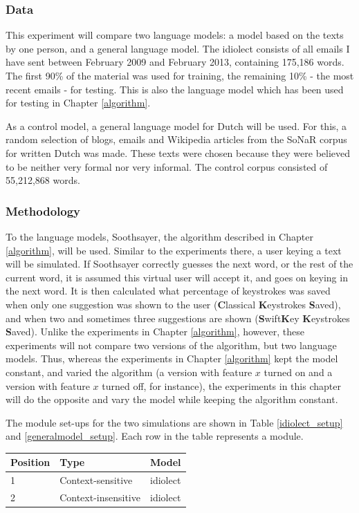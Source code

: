 \documentclass[11pt]{article}
\let\originaltable\table
\let\endoriginaltable\endtable
\renewenvironment{table}[1][ht]{%
  \originaltable[#1]
  \centering}%
  {\endoriginaltable}
\begin{document}
\subsubsection{Data} \label{data_simple}
This experiment will compare two language models: a model based on the texts by one person, and a general language model. The idiolect consists of all emails I have sent between February 2009 and February 2013, containing 175,186 words. The first 90\% of the material was used for training, the remaining 10\% - the most recent emails - for testing. This is also the language model which has been used for testing in Chapter \ref{algorithm}. 

As a control model, a general language model for Dutch will be used. For this, a random selection of blogs, emails and Wikipedia articles from the SoNaR corpus for written Dutch \cite{oostdijk+13} was made. These texts were chosen because they were believed to be neither very formal nor very informal. The control corpus consisted of 55,212,868 words.

\subsubsection{Methodology}
To the language models, Soothsayer, the algorithm described in Chapter \ref{algorithm}, will be used. Similar to the experiments there, a user keying a text will be simulated. If Soothsayer correctly guesses the next word, or the rest of the current word, it is assumed this virtual user will accept it, and goes on keying in the next word. It is then calculated what percentage of keystrokes was saved when only one suggestion was shown to the user (\textbf{C}lassical \textbf{K}eystrokes \textbf{S}aved), and when two and sometimes three suggestions are shown (\textbf{S}wift\textbf{K}ey \textbf{K}eystrokes \textbf{S}aved). Unlike the experiments in Chapter \ref{algorithm}, however, these experiments will not compare two versions of the algorithm, but two language models. Thus, whereas the experiments in Chapter \ref{algorithm} kept the model constant, and varied the algorithm (a version with feature $x$ turned on and a version with feature $x$ turned off, for instance), the experiments in this chapter will do the opposite and vary the model while keeping the algorithm constant. 

The module set-ups for the two simulations are shown in Table \ref{idiolect_setup} and \ref{generalmodel_setup}. Each row in the table represents a module.

\begin{table}[H]
\begin{tabular}{lll} 
Position&Type&Model\\
\hline
1&Context-sensitive&idiolect\\
2&Context-insensitive&idiolect\\
\end{tabular} 
\caption{Module order for a simple idiolect simulation.} \label{idiolect_setup}  
\end{table}
\end{document}
